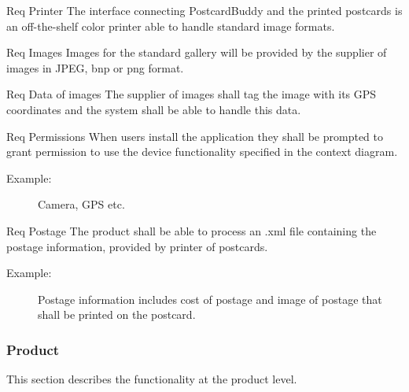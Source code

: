 \documentclass[10pt,a4paper]{article}
\begin{document}
\begin {description}
	\item [Req \thesubsubsection {.\theinterf} Printer] The interface connecting PostcardBuddy and the printed postcards is an off-the-shelf color printer able to handle standard image formats.

	\item [Req \thesubsubsection {.\theinterf} Images] Images for the standard gallery will be provided by the supplier of images in JPEG, bnp or png format.

	\item [Req \thesubsubsection {.\theinterf} Data of images] The supplier of images shall tag the image with its GPS coordinates and the system shall be able to handle this data.

	\item [Req \thesubsubsection {.\theinterf} Permissions] When users install the application they shall be prompted to grant permission to use the device functionality specified in the context diagram.  
	\begin{description}
\item[Example:] Camera, GPS etc.
	\end{description} 
	\item [Req \thesubsubsection {.\theinterf} Postage] The product shall be able to process an .xml file containing the postage information, provided by printer of postcards.
	\begin{description}
	\item[Example:] Postage information includes cost of postage and image of postage that shall be printed on the postcard.
	\end{description}	 
\end{description}

\subsubsection{Product} \label{ssec:product}
This section describes the functionality at the product level. 

\newcommand{\rprod}[1]{\refstepcounter{product}\label{#1}}
\end{document}

